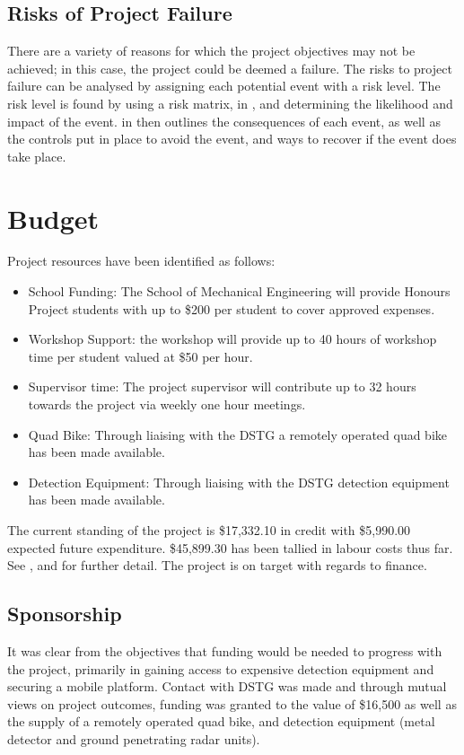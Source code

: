 \documentclass[main.tex]{subfiles}
\begin{document}
\subsection{Risks of Project Failure}
There are a variety of reasons for which the project objectives may not be achieved; in this case, the project could be deemed a failure. The risks to project failure can be analysed by assigning each potential event with a risk level. The risk level is found by using a risk matrix,  in , and determining the likelihood and impact of the event.  in  then outlines the consequences of each event, as well as the controls put in place to avoid the event, and ways to recover if the event does take place.

\section{Budget}
Project resources have been identified as follows:
\begin{itemize}
\item School Funding: The School of Mechanical Engineering will provide Honours Project students with up to \$200 per student to cover approved expenses.
\item Workshop Support: the workshop will provide up to 40 hours of workshop time per student valued at \$50 per hour.
\item Supervisor time: The project supervisor will contribute up to 32 hours towards the project via weekly one hour meetings.
\item Quad Bike: Through liaising with the DSTG a remotely operated quad bike has been made available.
\item Detection Equipment: Through liaising with the DSTG detection equipment has been made available.
\end{itemize}
The current standing of the project is \$17,332.10 in credit with \$5,990.00 expected future expenditure. \$45,899.30 has been tallied in labour costs thus far. See , and  for further detail. The project is on target with regards to finance.

\subsection{Sponsorship}
It was clear from the objectives that funding would be needed to progress with the project, primarily in gaining access to expensive detection equipment and securing a mobile platform.  Contact with DSTG was made and through mutual views on project outcomes, funding was granted to the value of \$16,500 as well as the supply of a remotely operated quad bike, and detection equipment (metal detector and ground penetrating radar units).
\end{document}
